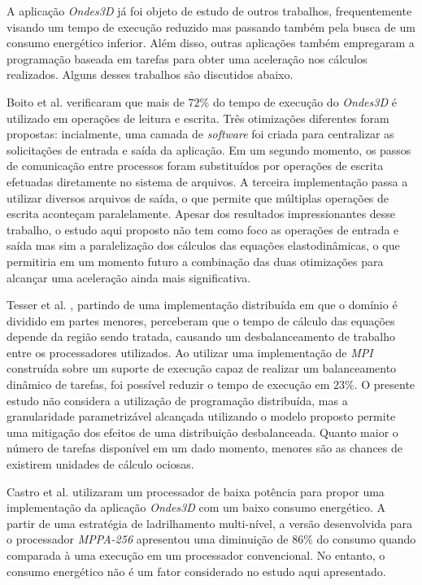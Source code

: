 \documentclass[cic,tc]{iiufrgs}
\begin{document}
A aplicação \textit{Ondes3D} já foi objeto de estudo de outros trabalhos, frequentemente visando um tempo de execução reduzido mas passando também pela busca de um consumo energético 
inferior. Além disso, outras aplicações também empregaram a programação baseada em tarefas para obter uma aceleração nos cálculos realizados. Alguns desses trabalhos são discutidos abaixo.

Boito et al. \cite{boito} verificaram que mais de $72\%$ do tempo de execução do \textit{Ondes3D} é utilizado em operações de leitura e escrita. Três otimizações diferentes foram
propostas: incialmente, uma camada de \textit{software} foi criada para centralizar as solicitações de entrada e saída da aplicação. Em um segundo momento, os passos de comunicação entre
processos foram substituídos por operações de escrita efetuadas diretamente no sistema de arquivos. A terceira implementação passa a utilizar diversos arquivos de saída, o que permite que
múltiplas operações de escrita aconteçam paralelamente. Apesar dos resultados impressionantes desse trabalho, o estudo aqui proposto não tem como foco as operações de entrada e saída mas
sim a paralelização dos cálculos das equações elastodinâmicas, o que permitiria em um momento futuro a combinação das duas otimizações para alcançar uma aceleração ainda mais significativa.

Tesser et al. \cite{dupros:hal-00797682}, partindo de uma implementação distribuída em que o domínio é dividido em partes menores, perceberam que o tempo de cálculo das equações
depende da região sendo tratada, causando um desbalanceamento de trabalho entre os processadores utilizados. Ao utilizar uma implementação de \textit{MPI} construída sobre um suporte
de execução capaz de realizar um balanceamento dinâmico de tarefas, foi possível reduzir o tempo de execução em $23\%$. O presente estudo não considera a utilização de programação
distribuída, mas a granularidade parametrizável alcançada utilizando o modelo proposto permite uma mitigação dos efeitos de uma distribuição desbalanceada. Quanto maior o número de tarefas
disponível em um dado momento, menores são as chances de existirem unidades de cálculo ociosas.

Castro et al. \cite{CASTRO2016108} utilizaram um processador de baixa potência para propor uma implementação da aplicação \textit{Ondes3D} com um baixo consumo energético. A partir
de uma estratégia de ladrilhamento multi-nível, a versão desenvolvida para o processador \textit{MPPA-256} apresentou uma diminuição de $86\%$ do consumo quando comparada à uma
execução em um processador convencional. No entanto, o consumo energético não é um fator considerado no estudo aqui apresentado.
\end{document}
